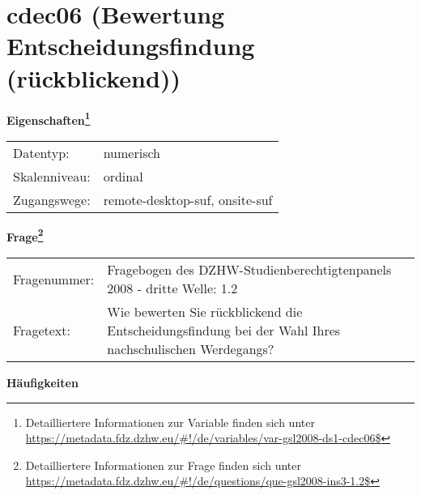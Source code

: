 
    \setcounter{footnote}{0}

    \vspace*{-1.8cm}
	\section{cdec06 (Bewertung Entscheidungsfindung (rückblickend))}
	\label{section:cdec06}



    \vspace*{0.5cm}
    \noindent\textbf{Eigenschaften\footnote{Detailliertere Informationen zur Variable finden sich unter
		\url{https://metadata.fdz.dzhw.eu/\#!/de/variables/var-gsl2008-ds1-cdec06$}}}\\
	\begin{tabularx}{\hsize}{@{}lX}
	Datentyp: & numerisch \\
	Skalenniveau: & ordinal \\
	Zugangswege: &
	  remote-desktop-suf, 
	  onsite-suf
 \\
    \end{tabularx}



				\vspace*{0.5cm}
                \noindent\textbf{Frage\footnote{Detailliertere Informationen zur Frage finden sich unter
		              \url{https://metadata.fdz.dzhw.eu/\#!/de/questions/que-gsl2008-ins3-1.2$}}}\\
				\begin{tabularx}{\hsize}{@{}lX}
					Fragenummer: &
					  Fragebogen des DZHW-Studienberechtigtenpanels 2008 - dritte Welle:
					  1.2
 \\
					Fragetext: & Wie bewerten Sie rückblickend die Entscheidungsfindung bei der Wahl Ihres nachschulischen Werdegangs? \\
				\end{tabularx}





        		\vspace*{0.5cm}
                \noindent\textbf{Häufigkeiten}

